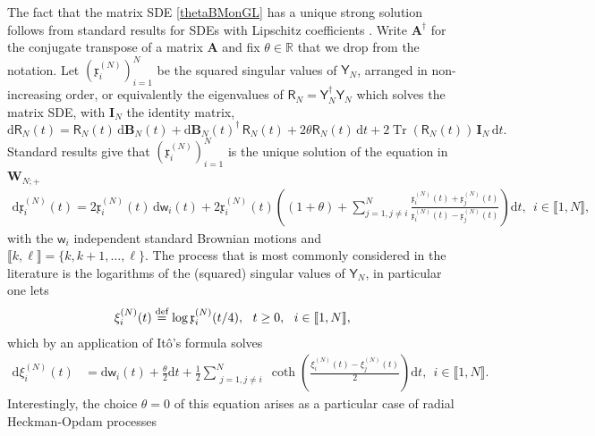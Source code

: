 \documentclass[]{article}
\begin{document}
The fact that the matrix SDE \eqref{thetaBMonGL} has a unique strong solution follows from standard results for SDEs with Lipschitz coefficients \cite{IkedaWatanabe,RevuzYor}. Write $\mathbf{A}^\dag$ for the conjugate transpose of a matrix $\mathbf{A}$ and fix $\theta\in \mathbb{R}$ that we drop from the notation. Let $(\mathfrak{x}_i^{(N)})_{i=1}^N$ be the squared singular values of $\mathsf{Y}_N$, arranged in non-increasing order, or equivalently the eigenvalues of $\mathsf{R}_N=\mathsf{Y}_N^\dag \mathsf{Y}_N$ which solves the matrix SDE, with $\mathbf{I}_N$ the identity matrix,
\begin{equation*}
\mathrm{d}\mathsf{R}_N(t)=\mathsf{R}_N(t)\, \mathrm{d} \boldsymbol{B}_N(t) + \mathrm{d} \boldsymbol{B}_N(t)^\dag \, \mathsf{R}_N(t) + 2\theta\mathsf{R}_N(t)\, \mathrm{d}t + 2\operatorname{Tr}(\mathsf{R}_N(t))\, \mathbf{I}_N\, \mathrm{d}t.
\end{equation*}
Standard results  \cite{MatrixYW,Graczyk-Malecki} give that $(\mathfrak{x}_i^{(N)})_{i=1}^N$ is the unique solution of the equation in $\mathbf{W}_{N;+}$ \begin{align}\label{evalX-SDE}
\mathrm{d} \mathfrak{x}_i^{(N)}(t) = 2\mathfrak{x}_i^{(N)}(t) \, \mathrm{d} \mathsf{w}_i(t) + 
2\mathfrak{x}_i^{(N)}(t)\left( (1+\theta)
+
\sum_{j=1, j \neq i}^N \frac{\mathfrak{x}_i^{(N)}(t) + \mathfrak{x}_j^{(N)}(t)}{\mathfrak{x}_i^{(N)}(t) - \mathfrak{x}_j^{(N)}(t)}\right)\mathrm{d}t,\  \  i\in \llbracket 1, N \rrbracket,
\end{align}
with the $\mathsf{w}_i$ independent standard Brownian motions and $\llbracket k,\ell \rrbracket =  \{k, k+1, \ldots, \ell\}$. The process that is most commonly considered in the literature is the logarithms of the (squared) singular values of $\mathsf{Y}_N$, in particular one lets
\begin{align}\label{XiDef}
  \xi_i^{(N)}(t)\overset{\textnormal{def}}{=}
  \displaystyle\log \mathfrak{x}_i^{(N)}(t/4), \  \ t\ge 0,\  \ i\in \llbracket 1, N \rrbracket,
\end{align}
which by an application of It\^o's formula solves
\begin{align*}
\mathrm{d}\xi_i^{(N)}(t)&= \mathrm{d} \mathsf{w}_i(t)
+ 
\frac{\theta}{2}\mathrm{d}t
+
 \frac{1}{2}\sum_{\substack{j=1, j \neq i}}^N \coth\left( \frac{\xi_i^{(N)}(t) - \xi_j^{(N)}(t)}{2} \right) \mathrm{d}t,
\  \ i \in \llbracket 1, N \rrbracket.
\end{align*}
Interestingly, the choice $\theta=0$ of this equation arises as a particular case of radial Heckman-Opdam processes
\end{document}
